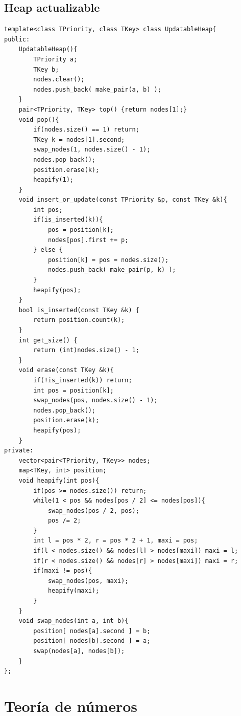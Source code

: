 \documentclass[10pt,spanish,mexico]{article}
\numberwithin{equation}{section}
\begin{document}
\begin{multicols}{2}
\vspace{-1.2\baselineskip}
\hrulefill
\subsection{Heap actualizable}
\begin{verbatim}
template<class TPriority, class TKey> class UpdatableHeap{
public:
	UpdatableHeap(){
        TPriority a;
        TKey b;
        nodes.clear();
        nodes.push_back( make_pair(a, b) );
    }
    pair<TPriority, TKey> top() {return nodes[1];}
    void pop(){
        if(nodes.size() == 1) return;
        TKey k = nodes[1].second;
        swap_nodes(1, nodes.size() - 1);
        nodes.pop_back();
        position.erase(k);
        heapify(1);
    }
    void insert_or_update(const TPriority &p, const TKey &k){
        int pos;
        if(is_inserted(k)){
            pos = position[k];
            nodes[pos].first += p;
        } else {
            position[k] = pos = nodes.size();
            nodes.push_back( make_pair(p, k) );
        }
        heapify(pos);
    }
    bool is_inserted(const TKey &k) {
        return position.count(k);
    }
    int get_size() {
        return (int)nodes.size() - 1;
    }
    void erase(const TKey &k){
        if(!is_inserted(k)) return;
        int pos = position[k];
        swap_nodes(pos, nodes.size() - 1);
        nodes.pop_back();
        position.erase(k);
        heapify(pos);
    }
private:
    vector<pair<TPriority, TKey>> nodes;
    map<TKey, int> position;
    void heapify(int pos){
        if(pos >= nodes.size()) return;
        while(1 < pos && nodes[pos / 2] <= nodes[pos]){
            swap_nodes(pos / 2, pos);
            pos /= 2;
        }
        int l = pos * 2, r = pos * 2 + 1, maxi = pos;
        if(l < nodes.size() && nodes[l] > nodes[maxi]) maxi = l;
        if(r < nodes.size() && nodes[r] > nodes[maxi]) maxi = r;
        if(maxi != pos){
            swap_nodes(pos, maxi);
            heapify(maxi);
        }
    }
    void swap_nodes(int a, int b){
        position[ nodes[a].second ] = b;
        position[ nodes[b].second ] = a;
        swap(nodes[a], nodes[b]);
    }
};
\end{verbatim}

\vspace{-1.2\baselineskip}
\hrulefill
\section{Teoría de números}

\end{multicols}
\end{document}
